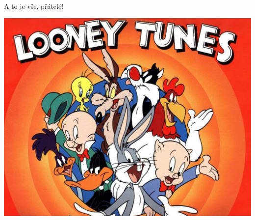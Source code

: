 \documentclass{beamer}
\begin{document}
\begin{frame}{A to je vše, přátelé!}
  \begin{center}
    \includegraphics[width=\textwidth]{looney_tunes}
  \end{center}
\end{frame}
\end{document}
